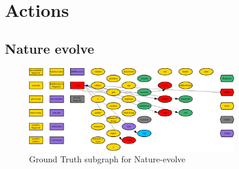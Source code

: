 \documentclass{article}%
\begin{document}
%
\section{Actions}%
\label{sec:Actions}%
\subsection{Nature evolve}%
\label{subsec:Nature evolve}%


\begin{figure}[ht]%
\centering%
\includegraphics[width=0.8\textwidth]{images/Nature-evolve.png}%
\caption{Ground Truth subgraph for Nature{-}evolve}%
\end{figure}

%
\end{document}
